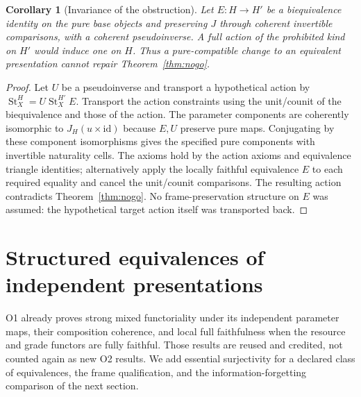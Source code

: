 \documentclass[11pt,a4paper]{article}
\newtheorem{corollary}[theorem]{Corollary}
\theoremstyle{definition}
\newcommand{\id}{\mathrm{id}}
\newcommand{\st}{\operatorname{St}}
\begin{document}
\begin{corollary}[Invariance of the obstruction]\label{cor:nogo-invariance}
Let $E:H\to H'$ be a biequivalence identity on the pure base objects and
preserving $J$ through coherent invertible comparisons, with a coherent
pseudoinverse. A full action of the prohibited kind on $H'$ would induce
one on $H$. Thus a pure-compatible change to an equivalent presentation
cannot repair Theorem~\ref{thm:nogo}.
\end{corollary}
\begin{proof}
Let $U$ be a pseudoinverse and transport a hypothetical action by
$\st^H_X=U\st^{H'}_XE$. Transport the action constraints using the
unit/counit of the biequivalence and those of the action. The parameter
components are coherently isomorphic to $J_H(u\times\id)$ because $E,U$
preserve pure maps. Conjugating by these component isomorphisms gives the
specified pure components with invertible naturality cells. The axioms
hold by the action axioms and equivalence triangle identities; alternatively
apply the locally faithful equivalence $E$ to each required equality and
cancel the unit/counit comparisons. The resulting action contradicts
Theorem~\ref{thm:nogo}. No frame-preservation structure on $E$ was assumed:
the hypothetical target action itself was transported back.
\end{proof}

\section{Structured equivalences of independent presentations}\label{sec:equivalence}

O1 already proves strong mixed functoriality under its independent parameter
maps, their composition coherence, and local full faithfulness when the
resource and grade functors are fully faithful. Those results are reused
and credited, not counted again as new O2 results. We add essential
surjectivity for a declared class of equivalences, the frame qualification,
and the information-forgetting comparison of the next section.
\end{document}
